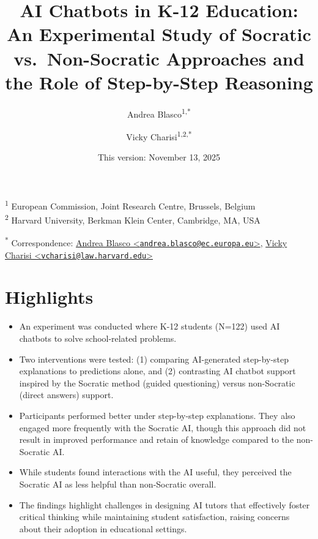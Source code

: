 \documentclass[
  12pt,
]{article}
\title{AI Chatbots in K-12 Education: An Experimental Study of Socratic vs.~Non-Socratic Approaches and the Role of Step-by-Step Reasoning}
\author{Andrea Blasco\textsuperscript{1,*} \and Vicky Charisi\textsuperscript{1,2,*}}
\date{This version: November 13, 2025}
\begin{document}
\maketitle

\textsuperscript{1} European Commission, Joint Research Centre, Brussels, Belgium\\
\textsuperscript{2} Harvard University, Berkman Klein Center, Cambridge, MA, USA

\textsuperscript{*} Correspondence: \href{mailto:andrea.blasco@ec.europa.eu}{Andrea Blasco \textless{}\href{mailto:andrea.blasco@ec.europa.eu}{\nolinkurl{andrea.blasco@ec.europa.eu}}\textgreater{}}, \href{mailto:vcharisi@law.harvard.edu}{Vicky Charisi \textless{}\href{mailto:vcharisi@law.harvard.edu}{\nolinkurl{vcharisi@law.harvard.edu}}\textgreater{}}

\section*{Highlights}\label{highlights}

\begin{itemize}
\item
  An experiment was conducted where K-12 students (N=122) used AI chatbots to solve school-related problems.
\item
  Two interventions were tested: (1) comparing AI-generated step-by-step explanations to predictions alone, and (2) contrasting AI chatbot support inspired by the Socratic method (guided questioning) versus non-Socratic (direct answers) support.
\end{itemize}

\begin{itemize}
\item
  Participants performed better under step-by-step explanations. They also engaged more frequently with the Socratic AI, though this approach did not result in improved performance and retain of knowledge compared to the non-Socratic AI.
\item
  While students found interactions with the AI useful, they perceived the Socratic AI as less helpful than non-Socratic overall.
\item
  The findings highlight challenges in designing AI tutors that effectively foster critical thinking while maintaining student satisfaction, raising concerns about their adoption in educational settings.
\end{itemize}
\end{document}
